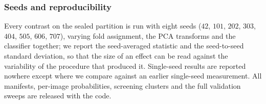 \subsubsection{Seeds and reproducibility}
Every contrast on the sealed partition is run with eight seeds
($42$, $101$, $202$, $303$, $404$, $505$, $606$, $707$), varying fold
assignment, the PCA transforms and the classifier together; we report the
seed-averaged statistic and the seed-to-seed standard deviation, so that the
size of an effect can be read against the variability of the procedure that
produced it. Single-seed results are reported nowhere except where we compare
against an earlier single-seed measurement. All manifests, per-image
probabilities, screening clusters and the full validation sweeps are released
with the code.
